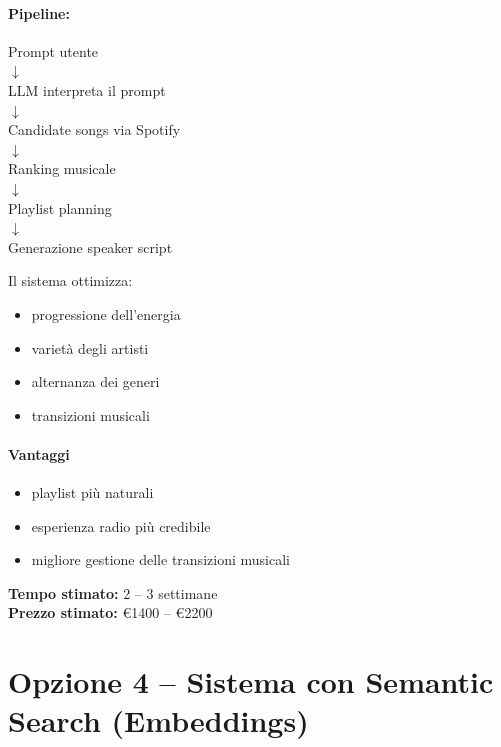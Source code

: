 \documentclass[11pt,a4paper]{article}
\begin{document}
\paragraph{Pipeline:}
\begin{center}
Prompt utente \\
$\downarrow$ \\
LLM interpreta il prompt \\
$\downarrow$ \\
Candidate songs via Spotify \\
$\downarrow$ \\
Ranking musicale \\
$\downarrow$ \\
Playlist planning \\
$\downarrow$ \\
Generazione speaker script
\end{center}

Il sistema ottimizza:
\begin{itemize}
    \item progressione dell'energia
    \item varietà degli artisti
    \item alternanza dei generi
    \item transizioni musicali
\end{itemize}

\paragraph{Vantaggi}
\begin{itemize}
    \item playlist più naturali
    \item esperienza radio più credibile
    \item migliore gestione delle transizioni musicali
\end{itemize}

\vspace{0.3cm}
\noindent \textbf{Tempo stimato:} 2 -- 3 settimane \\[0.2cm]
\noindent \textbf{Prezzo stimato:} €1400 -- €2200

\vspace{0.5cm}
\hrulefill
\vspace{0.5cm}

\section{Opzione 4 -- Sistema con Semantic Search (Embeddings)}
\end{document}
